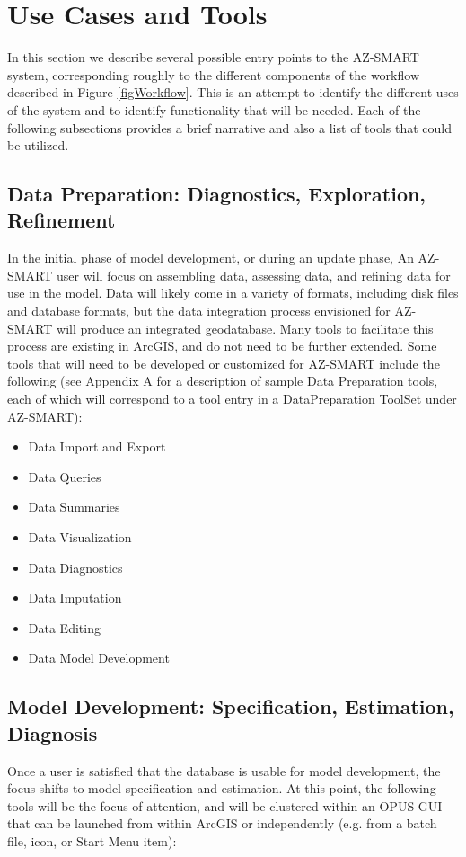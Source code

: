 \section{Use Cases and Tools}

In this section we describe several possible entry points to the AZ-SMART system, corresponding roughly to the different components of the workflow described in Figure \ref{figWorkflow}.
This is an attempt to identify the different uses of the system and to identify
functionality that will be needed.  Each of the following subsections
provides a brief narrative and also a list of tools that could be utilized.

\subsection{Data Preparation: Diagnostics, Exploration, Refinement}

In the initial phase of model development, or during an update phase, An AZ-SMART user will 
focus on assembling data, assessing data, and refining data for use in the model.  Data will
likely come in a variety of formats, including disk files and database formats,
but the data integration process envisioned for AZ-SMART will produce an integrated geodatabase.
Many tools to facilitate this process are existing in ArcGIS, and do not need to be further extended.  Some tools that will need to be developed or customized for AZ-SMART include the following 
(see Appendix A for a description of sample Data Preparation tools, each of which will correspond to a tool entry in a DataPreparation ToolSet under AZ-SMART):

\begin{itemize}
    \item Data Import and Export
    \item Data Queries
    \item Data Summaries
    \item Data Visualization
    \item Data Diagnostics
    \item Data Imputation
    \item Data Editing
    \item Data Model Development
\end{itemize}

\subsection{Model Development: Specification, Estimation, Diagnosis}
Once a user is satisfied that the database is usable for model development, the focus shifts to model specification and estimation.  At this point, the following tools will be the focus of attention, and will be clustered within an OPUS GUI that can be launched from within ArcGIS or independently (e.g. from a batch file, icon, or Start Menu item):

